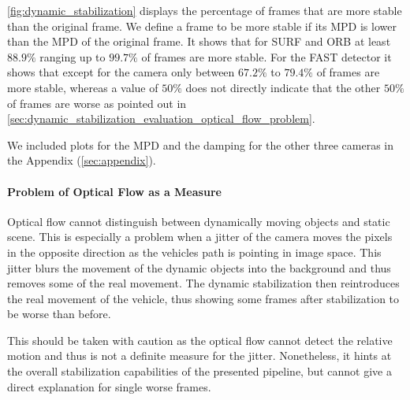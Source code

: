 \autoref{fig:dynamic_stabilization} displays the percentage of frames that are more stable than the original frame.
We define a frame to be more stable if its MPD is lower than the MPD of the original frame. 
It shows that for SURF and ORB at least $88.9\%$ ranging up to $99.7\%$ of frames are more stable.
For the FAST detector it shows that except for the  camera only between $67.2\%$ to $79.4\%$ of frames are more stable, whereas a value of $50\%$ does not directly indicate that the other $50\%$ of frames are worse as pointed out in \autoref{sec:dynamic_stabilization_evaluation_optical_flow_problem}.  

We included plots for the MPD and the damping for the other three cameras in the Appendix (\autoref{sec:appendix}).




\paragraph{Problem of Optical Flow as a Measure}
\label{sec:dynamic_stabilization_evaluation_optical_flow_problem}
Optical flow cannot distinguish between dynamically moving objects and static scene.
This is especially a problem when a jitter of the camera moves the pixels in the opposite direction as the vehicles path is pointing in image space.
This jitter blurs the movement of the dynamic objects into the background and thus removes some of the real movement.
The dynamic stabilization then reintroduces the real movement of the vehicle, thus showing some frames after stabilization to be worse than before. 

This should be taken with caution as the optical flow cannot detect the relative motion and thus is not a definite measure for the jitter.
Nonetheless, it hints at the overall stabilization capabilities of the presented pipeline, but cannot give a direct explanation for single worse frames.



